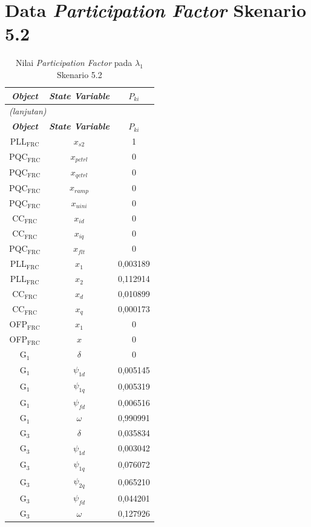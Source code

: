 \section{Data \textit{Participation Factor} Skenario 5.2}
\begingroup
\fontsize{12}{14.4}\selectfont
\setlength{\tabcolsep}{8pt}
\begin{longtable}{c c c} \caption[]{Nilai
	\textit{Participation Factor} pada $\lambda_1$ Skenario 5.2}
	\label{tab:prf_sk52_lampiran} \\
	\toprule
	\multicolumn{1}{c}{\textbf{\textit{Object}}} & \textbf{\textit{State
	Variable}} & \textbf{$P_{ki}$} \\
	\midrule
	\endfirsthead
	\multicolumn{3}{l}{\textit{(lanjutan)}} \\
	\toprule
	\multicolumn{1}{c}{\textbf{\textit{Object}}} & \textbf{\textit{State
	Variable}} & \textbf{$P_{ki}$} \\
	\midrule
	\endhead
	\bottomrule
	\endfoot
	PLL$_\text{FRC}$ & $x_{s2}$ & 1         \\
	PQC$_\text{FRC}$ & $x_{pctrl}$ & 0         \\
	PQC$_\text{FRC}$ & $x_{qctrl}$ & 0         \\
	PQC$_\text{FRC}$ & $x_{ramp}$ & 0         \\
	PQC$_\text{FRC}$ & $x_{uini}$ & 0         \\
	CC$_\text{FRC}$ & $x_{id}$ & 0         \\
	CC$_\text{FRC}$ & $x_{iq}$ & 0         \\
	PQC$_\text{FRC}$ & $x_{flt}$ & 0         \\
	PLL$_\text{FRC}$ & $x_1$ & 0,003189  \\
	PLL$_\text{FRC}$ & $x_2$ & 0,112914  \\
	CC$_\text{FRC}$ & $x_d$ & 0,010899  \\
	CC$_\text{FRC}$ & $x_q$ & 0,000173  \\
	OFP$_\text{FRC}$ & $x_1$ & 0         \\
	OFP$_\text{FRC}$ & $x$ & 0         \\
	G$_1$ & $\delta$ & 0         \\
	G$_1$ & $\psi_{1d}$ & 0,005145  \\
	G$_1$ & $\psi_{1q}$ & 0,005319  \\
	G$_1$ & $\psi_{fd}$ & 0,006516  \\
	G$_1$ & $\omega$ & 0,990991  \\
	G$_3$ & $\delta$ & 0,035834  \\
	G$_3$ & $\psi_{1d}$ & 0,003042  \\
	G$_3$ & $\psi_{1q}$ & 0,076072  \\
	G$_3$ & $\psi_{2q}$ & 0,065210  \\
	G$_3$ & $\psi_{fd}$ & 0,044201  \\
	G$_3$ & $\omega$ & 0,127926  \\
\end{longtable}
\par
\endgroup